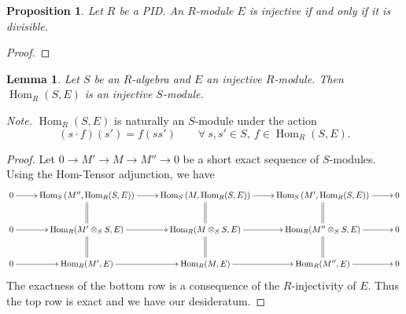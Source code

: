 \documentclass[10pt]{article}
\theoremstyle{thmstyle}
\newtheorem{lemma}[theorem]{Lemma}
\newtheorem{proposition}[theorem]{Proposition}
\theoremstyle{defstyle}
\newcommand{\Hom}{\operatorname{Hom}}
\begin{document}
\begin{proposition}
    Let $R$ be a PID. An $R$-module $E$ is injective if and only if it is divisible.
\end{proposition}
\begin{proof}
\end{proof}

\begin{lemma}
    Let $S$ be an $R$-algebra and $E$ an injective $R$-module. Then $\Hom_R(S, E)$ is an injective $S$-module.
\end{lemma}
\noindent\emph{Note.} $\Hom_R(S, E)$ is naturally an $S$-module under the action 
\begin{equation*}
    (s\cdot f)(s') = f(ss') \qquad\forall~s, s'\in S,~f\in\Hom_R(S, E).
\end{equation*}
\begin{proof}
    Let $0\to M'\to M\to M''\to 0$ be a short exact sequence of $S$-modules. Using the Hom-Tensor adjunction, we have 
    \begin{equation*}
        \xymatrix {
            0\ar[r] & \Hom_S\left(M'',\Hom_R(S, E)\right)\ar[r]\ar@{=}[d] & \Hom_S\left(M,\Hom_R(S, E)\right)\ar[r]\ar@{=}[d] & \Hom_S\left(M', \Hom_R(S, E)\right)\ar[r]\ar@{=}[d] & 0\\
            0\ar[r] & \Hom_R(M'\otimes_S S, E)\ar@{=}[d]\ar[r] & \Hom_R(M\otimes_S S, E)\ar@{=}[d]\ar[r] & \Hom_R(M''\otimes_S S, E)\ar@{=}[d]\ar[r] & 0\\
            0\ar[r] & \Hom_R(M', E)\ar[r] & \Hom_R(M, E)\ar[r] & \Hom_R(M'', E)\ar[r] & 0
        }
    \end{equation*}
    The exactness of the bottom row is a consequence of the $R$-injectivity of $E$. Thus the top row is exact and we have our desideratum.
\end{proof}
\end{document}

